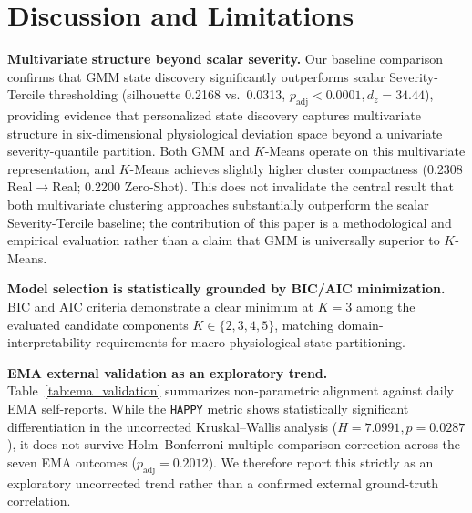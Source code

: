 \documentclass[conference]{IEEEtran}
\begin{document}
\section{Discussion and Limitations}

\textbf{Multivariate structure beyond scalar severity.} Our baseline comparison confirms that GMM state discovery significantly outperforms scalar Severity-Tercile thresholding (silhouette 0.2168 vs.\ 0.0313, $p_{\text{adj}} < 0.0001, d_z = 34.44$), providing evidence that personalized state discovery captures multivariate structure in six-dimensional physiological deviation space beyond a univariate severity-quantile partition. Both GMM and $K$-Means operate on this multivariate representation, and $K$-Means achieves slightly higher cluster compactness (0.2308 Real$\rightarrow$Real; 0.2200 Zero-Shot). This does not invalidate the central result that both multivariate clustering approaches substantially outperform the scalar Severity-Tercile baseline; the contribution of this paper is a methodological and empirical evaluation rather than a claim that GMM is universally superior to $K$-Means.

\textbf{Model selection is statistically grounded by BIC/AIC minimization.} BIC and AIC criteria demonstrate a clear minimum at $K{=}3$ among the evaluated candidate components $K \in \{2, 3, 4, 5\}$, matching domain-interpretability requirements for macro-physiological state partitioning.

\textbf{EMA external validation as an exploratory trend.} Table~\ref{tab:ema_validation} summarizes non-parametric alignment against daily EMA self-reports. While the \texttt{HAPPY} metric shows statistically significant differentiation in the uncorrected Kruskal--Wallis analysis ($H=7.0991, p=0.0287$), it does not survive Holm--Bonferroni multiple-comparison correction across the seven EMA outcomes ($p_{\text{adj}} = 0.2012$). We therefore report this strictly as an exploratory uncorrected trend rather than a confirmed external ground-truth correlation.
\end{document}
